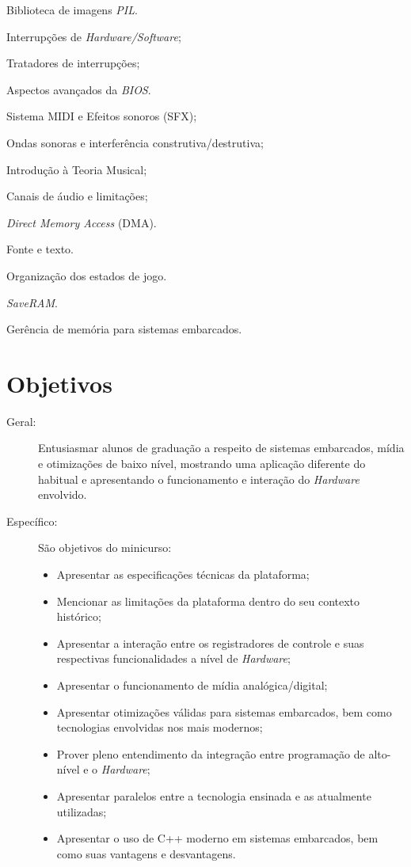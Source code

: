 \documentclass{article}
\begin{document}
\begin{itemize*}[label={}]
    \item[] Biblioteca de imagens \textit{PIL}.
    \item[] Interrupções de \textit{Hardware/Software};
    \item[] Tratadores de interrupções;
    \item[] Aspectos avançados da \textit{BIOS}.
    \item[] Sistema MIDI e Efeitos sonoros (SFX);
    \item[] Ondas sonoras e interferência construtiva/destrutiva;
    \item[] Introdução à Teoria Musical;
    \item[] Canais de áudio e limitações;
    \item[] \textit{Direct Memory Access} (DMA).
    \item[] Fonte e texto.
    \item[] Organização dos estados de jogo.
    \item[] \textit{SaveRAM}.
    \item[] Gerência de memória para sistemas embarcados.
\end{itemize*}

\section{Objetivos}

\begin{description}
    \item[Geral:] Entusiasmar alunos de graduação a respeito de sistemas embarcados, mídia e otimizações de baixo nível, mostrando uma aplicação diferente do habitual e apresentando o funcionamento e interação do \textit{Hardware} envolvido.
    \item[Específico:] São objetivos do minicurso:
        \begin{itemize}[label={-}]
                \item Apresentar as especificações técnicas da plataforma;
                \item Mencionar as limitações da plataforma dentro do seu  contexto histórico;
                \item Apresentar a interação entre os registradores de controle e suas respectivas funcionalidades a nível de \textit{Hardware};
                \item Apresentar o funcionamento de mídia analógica/digital;
                \item Apresentar otimizações válidas para sistemas embarcados, bem como tecnologias envolvidas nos mais modernos;
                \item Prover pleno entendimento da integração entre programação de alto-nível e o \textit{Hardware};
                \item Apresentar paralelos entre a tecnologia ensinada e as atualmente utilizadas;
                \item Apresentar o uso de C++ moderno em sistemas embarcados, bem como suas vantagens e desvantagens.
        \end{itemize}
\end{description}
\end{document}
